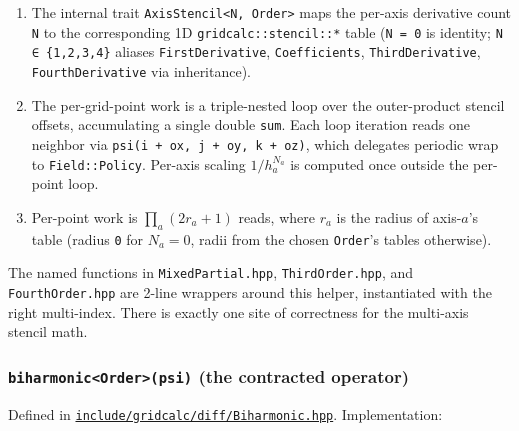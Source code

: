 \begin{enumerate}
\def\labelenumi{\arabic{enumi}.}
\tightlist
\item
  The internal trait \passthrough{\lstinline!AxisStencil<N, Order>!}
  maps the per-axis derivative count \passthrough{\lstinline!N!} to the
  corresponding 1D \passthrough{\lstinline!gridcalc::stencil::*!} table
  (\passthrough{\lstinline!N = 0!} is identity;
  \passthrough{\lstinline!N ∈ \{1,2,3,4\}!} aliases
  \passthrough{\lstinline!FirstDerivative!},
  \passthrough{\lstinline!Coefficients!},
  \passthrough{\lstinline!ThirdDerivative!},
  \passthrough{\lstinline!FourthDerivative!} via inheritance).
\item
  The per-grid-point work is a triple-nested loop over the outer-product
  stencil offsets, accumulating a single double
  \passthrough{\lstinline!sum!}. Each loop iteration reads one neighbor
  via \passthrough{\lstinline!psi(i + ox, j + oy, k + oz)!}, which
  delegates periodic wrap to \passthrough{\lstinline!Field::Policy!}.
  Per-axis scaling \(1/h_a^{N_a}\) is computed once outside the
  per-point loop.
\item
  Per-point work is \(\prod_a (2 r_a + 1)\) reads, where \(r_a\) is the
  radius of axis-\(a\)'s table (radius \passthrough{\lstinline!0!} for
  \(N_a = 0\), radii from the chosen \passthrough{\lstinline!Order!}'s
  tables otherwise).
\end{enumerate}

The named functions in \passthrough{\lstinline!MixedPartial.hpp!},
\passthrough{\lstinline!ThirdOrder.hpp!}, and
\passthrough{\lstinline!FourthOrder.hpp!} are 2-line wrappers around
this helper, instantiated with the right multi-index. There is exactly
one site of correctness for the multi-axis stencil math.

\subsubsection{\texorpdfstring{\texttt{biharmonic\textless{}Order\textgreater{}(psi)}
(the contracted
operator)}{biharmonic\textless Order\textgreater(psi) (the contracted operator)}}\label{biharmonicorderpsi-the-contracted-operator}

Defined in
\href{../../../include/gridcalc/diff/Biharmonic.hpp}{\passthrough{\lstinline!include/gridcalc/diff/Biharmonic.hpp!}}.
Implementation:


